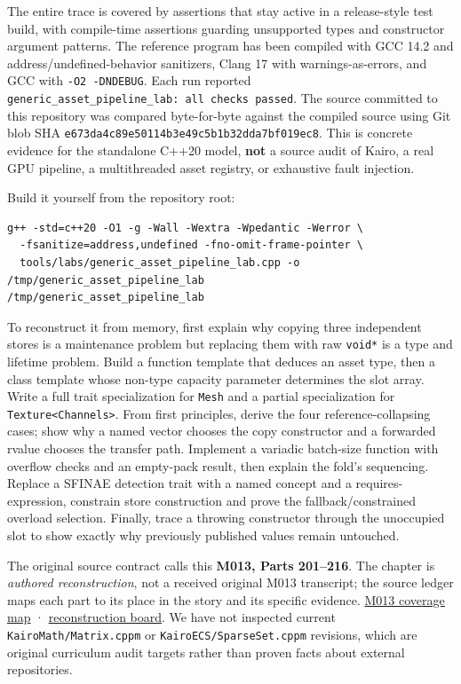The entire trace is covered by assertions that stay active in a release-style test build, with compile-time assertions guarding unsupported types and constructor argument patterns. The reference program has been compiled with GCC 14.2 and address/undefined-behavior sanitizers, Clang 17 with warnings-as-errors, and GCC with \texttt{-O2\ -DNDEBUG}. Each run reported \texttt{generic\_asset\_pipeline\_lab:\ all\ checks\ passed}. The source committed to this repository was compared byte-for-byte against the compiled source using Git blob SHA \texttt{e673da4c89e50114b3e49c5b1b32dda7bf019ec8}. This is concrete evidence for the standalone C++20 model, \textbf{not} a source audit of Kairo, a real GPU pipeline, a multithreaded asset registry, or exhaustive fault injection.

Build it yourself from the repository root:

\begin{verbatim}
g++ -std=c++20 -O1 -g -Wall -Wextra -Wpedantic -Werror \
  -fsanitize=address,undefined -fno-omit-frame-pointer \
  tools/labs/generic_asset_pipeline_lab.cpp -o /tmp/generic_asset_pipeline_lab
/tmp/generic_asset_pipeline_lab
\end{verbatim}

To reconstruct it from memory, first explain why copying three independent stores is a maintenance problem but replacing them with raw \texttt{void*} is a type and lifetime problem. Build a function template that deduces an asset type, then a class template whose non-type capacity parameter determines the slot array. Write a full trait specialization for \texttt{Mesh} and a partial specialization for \texttt{Texture\textless{}Channels\textgreater{}}. From first principles, derive the four reference-collapsing cases; show why a named vector chooses the copy constructor and a forwarded rvalue chooses the transfer path. Implement a variadic batch-size function with overflow checks and an empty-pack result, then explain the fold's sequencing. Replace a SFINAE detection trait with a named concept and a requires-expression, constrain store construction and prove the fallback/constrained overload selection. Finally, trace a throwing constructor through the unoccupied slot to show exactly why previously published values remain untouched.

The original source contract calls this \textbf{M013, Parts 201--216}. The chapter is \emph{authored reconstruction}, not a received original M013 transcript; the source ledger maps each part to its place in the story and its specific evidence. \hyperref[appendix-fd090d982a15-m013-parts-201216-generic-asset-preparation-with-constrained-apis]{M013 coverage map} · \hyperref[appendix-960160274237-one-asset-pipeline-many-types-m013-retrieval]{reconstruction board}. We have not inspected current \texttt{KairoMath/Matrix.cppm} or \texttt{KairoECS/SparseSet.cppm} revisions, which are original curriculum audit targets rather than proven facts about external repositories.

